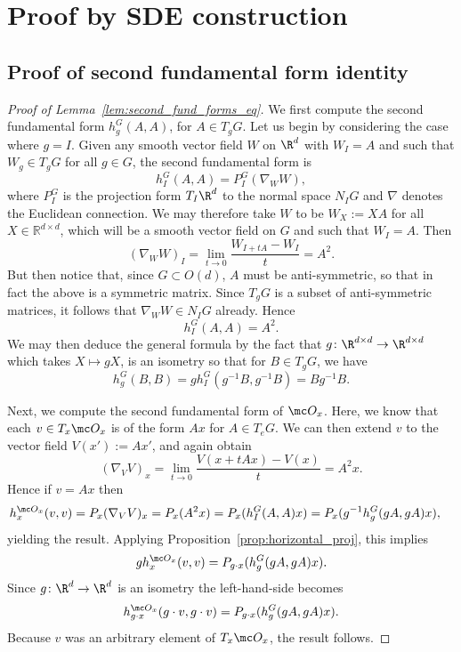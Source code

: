 \documentclass[twoside,a4paper,11pt]{article}
\theoremstyle{plain}
\begin{document}
\section{Proof by SDE construction}
\label{appendix:SDE_proof}


\subsection{Proof of second fundamental form identity}
\label{subsec:second_fund_forms_eq}
\begin{proof}[Proof of Lemma~\ref{lem:second_fund_forms_eq}]
We first compute the second fundamental
form $h^G_g(A, A)$, for $A \in T_gG$. Let us begin
by considering the case where $g = I$. Given
any smooth vector field $W$ on $\R^d$ with
$W_I = A$ and such that $W_g \in T_gG$ for all $g\in G$, the second fundamental form is
$$
h^G_I(A, A) = P^G_I(\nabla_{W} W),
$$ where $P^G_I$ is the projection form $T_I\R^d$ to the normal
space $N_IG$ and $\nabla$ denotes the Euclidean connection.
We may therefore take $W$ to be $W_X:= XA$ for all $X \in \mathbb{R}^{d \times d}$,
which will be a 
smooth vector field on $G$ and such that $W_I = A$. Then
$$
(\nabla_{W}W)_I = \lim_{t\to 0} \frac{W_{I + tA} - W_{I}}{t}
= A^2.
$$ But then notice that, since $G \subset O(d)$, $A$ must be anti-symmetric,
so that in fact the above is a symmetric matrix. Since
$T_gG$ is a subset of anti-symmetric matrices, it follows that
$\nabla_W W \in N_IG$ already. Hence
$$
h^G_I(A, A) = A^2.
$$ We may then deduce the general formula by the fact that
$g \colon \R^{d \times d} \to \R^{d \times d}$ which takes
$X \mapsto gX$, is an isometry so that for $B \in T_gG$, we have
$$
h^G_g(B, B) = gh^G_I(g^{-1}B, g^{-1}B) = Bg^{-1}B.
$$

Next, we compute the second fundamental form of $\mc O_x$.
Here, we know that each $v \in T_x \mc O_x$ is of the form
$Ax$ for $A \in T_eG$. We can then extend $v$ to the vector
field $V(x') := Ax'$, and again obtain
$$
(\nabla_V V)_x = \lim_{t\to 0} \frac{V(x + tAx) - V(x)}{t}
= A^2x.
$$ Hence if $v = Ax$ then
\begin{align*}
h^{\mc O_x}_x(v, v)= P_x(\nabla_V V)_x = P_x(A^2x) = P_x(h^G_I(A, A)x)&=
P_x(g^{-1}h^G_g(gA, gA)x),
\end{align*}
yielding the result.
Applying Proposition~\ref{prop:horizontal_proj}, this implies
$$
gh_x^{\mc O_x}(v, v) = P_{g\cdot x}
(h_g^G(gA, gA)x).
$$ Since $g \colon \R^d \to \R^d$ is an isometry the left-hand-side
becomes
$$
h_{g\cdot x}^{\mc O_x}(g\cdot v, g \cdot v)
= P_{g\cdot x}(h_g^G(gA, gA)x).
$$ Because $v$ was an arbitrary element of $T_x \mc O_x$,
the result follows.
\end{proof}
\end{document}
